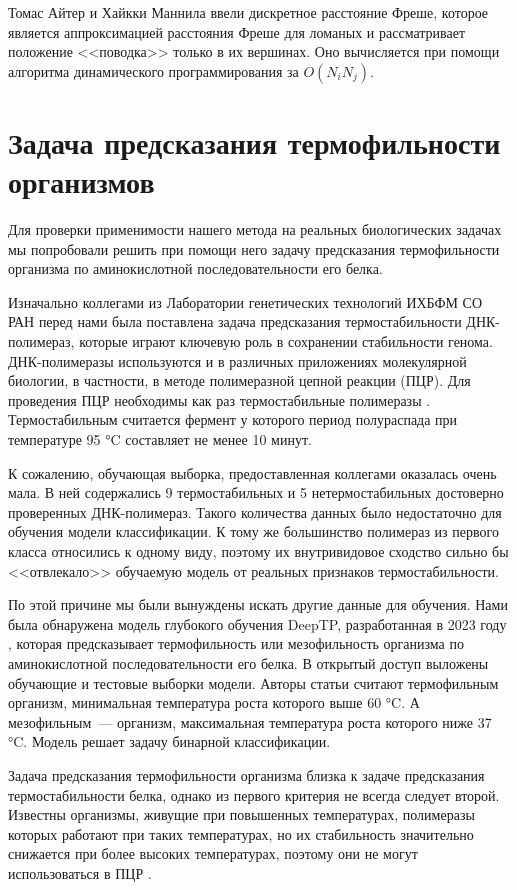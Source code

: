 Томас Айтер и Хайкки Маннила ввели \cite{Eiter1994ComputingDF} дискретное расстояние Фреше, которое является аппроксимацией расстояния Фреше для ломаных и рассматривает положение <<поводка>> только в их вершинах. Оно вычисляется при помощи алгоритма динамического программирования за $O(N_iN_j)$.

\section{Задача предсказания термофильности организмов}

Для проверки применимости нашего метода на реальных биологических задачах мы попробовали решить при помощи него задачу предсказания термофильности организма по аминокислотной последовательности его белка.

Изначально коллегами из Лаборатории генетических технологий ИХБФМ СО РАН перед нами была поставлена задача предсказания термостабильности ДНК-полимераз, которые играют ключевую роль в сохранении стабильности генома. ДНК-полимеразы используются и в различных приложениях молекулярной биологии, в частности, в методе полимеразной цепной реакции (ПЦР). Для проведения ПЦР необходимы как раз термостабильные полимеразы \cite{bulygin}. Термостабильным считается фермент у которого период полураспада при температуре 95 °C составляет не менее 10 минут.

К сожалению, обучающая выборка, предоставленная коллегами оказалась очень мала. В ней содержались 9 термостабильных и 5 нетермостабильных достоверно проверенных ДНК-полимераз. Такого количества данных было недостаточно для обучения модели классификации. К тому же большинство полимераз из первого класса относились к одному виду, поэтому их внутривидовое сходство сильно бы <<отвлекало>> обучаемую модель от реальных признаков термостабильности.

По этой причине мы были вынуждены искать другие данные для обучения. Нами была обнаружена модель глубокого обучения DeepTP, разработанная в 2023 году \cite{Zhao2023}, которая предсказывает термофильность или мезофильность организма по аминокислотной последовательности его белка. В открытый доступ выложены обучающие и тестовые выборки модели. Авторы статьи считают термофильным организм, минимальная температура роста которого выше 60 °C. А мезофильным~--- организм, максимальная температура роста которого ниже 37 °C. Модель решает задачу бинарной классификации.

Задача предсказания термофильности организма близка к задаче предсказания термостабильности белка, однако из первого критерия не всегда следует второй. Известны организмы, живущие при повышенных температурах, полимеразы которых работают при таких температурах, но их стабильность значительно снижается при более высоких температурах, поэтому они не могут использоваться в ПЦР \cite{bulygin}.

